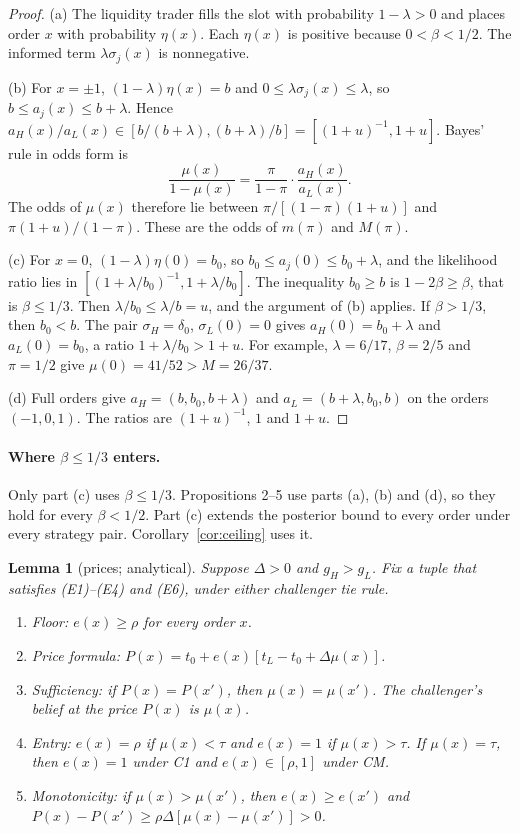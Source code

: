 \documentclass[11pt]{article}
\newtheorem{lemma}{Lemma}
\theoremstyle{definition}
\begin{document}
\begin{proof}
(a) The liquidity trader fills the slot with probability $1-\lambda>0$ and places order $x$ with probability
$\eta(x)$. Each $\eta(x)$ is positive because $0<\beta<1/2$. The informed term $\lambda\sigma_j(x)$ is nonnegative.

(b) For $x=\pm1$, $(1-\lambda)\eta(x)=b$ and $0\le\lambda\sigma_j(x)\le\lambda$, so $b\le a_j(x)\le b+\lambda$.
Hence $a_H(x)/a_L(x)\in[b/(b+\lambda),(b+\lambda)/b]=[(1+u)^{-1},1+u]$. Bayes' rule in odds form is
\[
\frac{\mu(x)}{1-\mu(x)}=\frac{\pi}{1-\pi}\cdot\frac{a_H(x)}{a_L(x)}.
\]
The odds of $\mu(x)$ therefore lie between $\pi/[(1-\pi)(1+u)]$ and $\pi(1+u)/(1-\pi)$. These are the odds of
$m(\pi)$ and $M(\pi)$.

(c) For $x=0$, $(1-\lambda)\eta(0)=b_0$, so $b_0\le a_j(0)\le b_0+\lambda$, and the likelihood ratio lies in
$[(1+\lambda/b_0)^{-1},1+\lambda/b_0]$. The inequality $b_0\ge b$ is $1-2\beta\ge\beta$, that is $\beta\le1/3$.
Then $\lambda/b_0\le\lambda/b=u$, and the argument of (b) applies. If $\beta>1/3$, then $b_0<b$. The pair
$\sigma_H=\delta_0$, $\sigma_L(0)=0$ gives $a_H(0)=b_0+\lambda$ and $a_L(0)=b_0$, a ratio $1+\lambda/b_0>1+u$.
For example, $\lambda=6/17$, $\beta=2/5$ and $\pi=1/2$ give $\mu(0)=41/52>M=26/37$.

(d) Full orders give $a_H=(b,b_0,b+\lambda)$ and $a_L=(b+\lambda,b_0,b)$ on the orders $(-1,0,1)$.
The ratios are $(1+u)^{-1}$, $1$ and $1+u$.
\end{proof}

\paragraph{Where $\beta\le 1/3$ enters.} Only part (c) uses $\beta\le1/3$. Propositions 2--5 use parts (a), (b)
and (d), so they hold for every $\beta<1/2$. Part (c) extends the posterior bound to every order under every
strategy pair. Corollary~\ref{cor:ceiling} uses it.

\begin{lemma}[prices; analytical]\label{lem:price}
Suppose $\Delta>0$ and $g_H>g_L$. Fix a tuple that satisfies (E1)--(E4) and (E6), under either challenger tie rule.
\begin{enumerate}[label=(\alph*)]
\item Floor: $e(x)\ge\rho$ for every order $x$.
\item Price formula: $P(x)=t_0+e(x)[t_L-t_0+\Delta\mu(x)]$.
\item Sufficiency: if $P(x)=P(x')$, then $\mu(x)=\mu(x')$. The challenger's belief at the price $P(x)$ is $\mu(x)$.
\item Entry: $e(x)=\rho$ if $\mu(x)<\tau$ and $e(x)=1$ if $\mu(x)>\tau$. If $\mu(x)=\tau$, then $e(x)=1$ under C1
  and $e(x)\in[\rho,1]$ under CM.
\item Monotonicity: if $\mu(x)>\mu(x')$, then $e(x)\ge e(x')$ and $P(x)-P(x')\ge\rho\Delta[\mu(x)-\mu(x')]>0$.
\end{enumerate}
\end{lemma}
\end{document}
